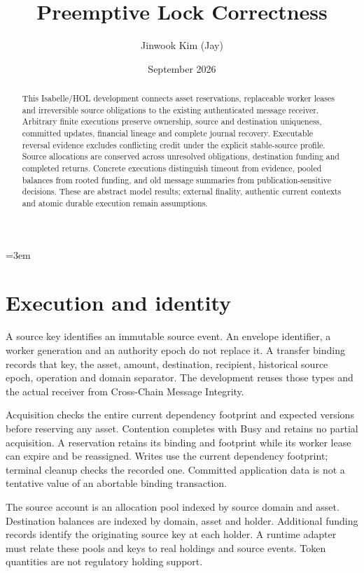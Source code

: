 \documentclass[11pt,a4paper]{article}
\begin{document}
\emergencystretch=3em
\title{Preemptive Lock Correctness}
\author{Jinwook Kim (Jay)}
\date{September 2026}
\maketitle

\begin{abstract}
This Isabelle/HOL development connects asset reservations, replaceable worker
leases and irreversible source obligations to the existing authenticated
message receiver. Arbitrary finite executions preserve ownership, source and
destination uniqueness, committed updates, financial lineage and complete
journal recovery. Executable reversal evidence excludes conflicting credit
under the explicit stable-source profile. Source allocations are conserved
across unresolved obligations, destination funding and completed returns.
Concrete executions distinguish timeout from evidence, pooled balances from
rooted funding, and old message summaries from publication-sensitive
decisions. These are abstract model results; external finality, authentic
current contexts and atomic durable execution remain assumptions.
\end{abstract}

\section{Execution and identity}

A source key identifies an immutable source event. An envelope identifier, a
worker generation and an authority epoch do not replace it. A transfer binding
records that key, the asset, amount, destination, recipient, historical source
epoch, operation and domain separator. The development reuses those types
and the actual receiver from Cross-Chain Message Integrity.

Acquisition checks the entire current dependency footprint and expected
versions before reserving any asset. Contention completes with Busy and
retains no partial acquisition. A reservation retains its binding and
footprint while its worker lease can expire and be reassigned. Writes use
the current dependency footprint; terminal cleanup checks the recorded one.
Committed application data is not a tentative value of an abortable binding
transaction.

The source account is an allocation pool indexed by source domain and asset.
Destination balances are indexed by domain, asset and holder. Additional
funding records identify the originating source key at each holder. A runtime
adapter must relate these pools and keys to real holdings and source events.
Token quantities are not regulatory holding support.
\end{document}

